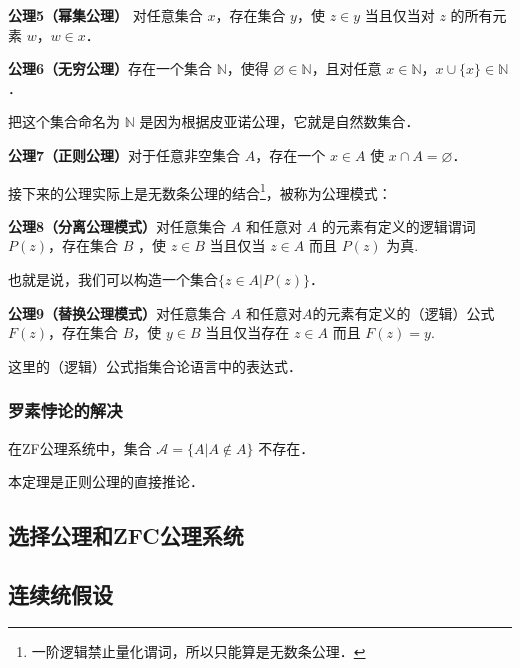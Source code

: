 \textbf{公理5（幂集公理）} 对任意集合 $x$，存在集合 $y$，使 $z\in y$ 当且仅当对 $z$ 的所有元素 $w$，$w\in x$．

\textbf{公理6（无穷公理）}存在一个集合 $\mathbb{N}$，使得 $\varnothing\in\mathbb{N}$，且对任意 $x\in \mathbb{N}$，$x\cup\{x\}\in\mathbb{N}$．

把这个集合命名为 $\mathbb{N}$ 是因为根据皮亚诺公理，它就是自然数集合．

\textbf{公理7（正则公理）}对于任意非空集合 $A$，存在一个 $x\in A$ 使 $x\cap A=\varnothing$．

接下来的公理实际上是无数条公理的结合\footnote{一阶逻辑禁止量化谓词，所以只能算是无数条公理．}，被称为公理模式：

\textbf{公理8（分离公理模式）}对任意集合 $A$ 和任意对 $A$ 的元素有定义的逻辑谓词 $P(z)$，存在集合 $B$ ，使 $z\in B$ 当且仅当 $z\in A$ 而且 $P(z)$ 为真.

也就是说，我们可以构造一个集合$\{z\in A | P(z)\}$．

\textbf{公理9（替换公理模式）}对任意集合 $A$ 和任意对$A$的元素有定义的（逻辑）公式$F(z)$，存在集合 $B$，使 $y\in B$ 当且仅当存在 $z\in A$ 而且 $F(z)=y$.

这里的（逻辑）公式指集合论语言中的表达式．

\subsubsection{罗素悖论的解决}
\begin{theorem}{}
在ZF公理系统中，集合 $\mathcal{A}=\{A|A\notin A\}$ 不存在．
\end{theorem}

本定理是正则公理的直接推论．


\subsection{选择公理和ZFC公理系统}

\subsection{连续统假设}




